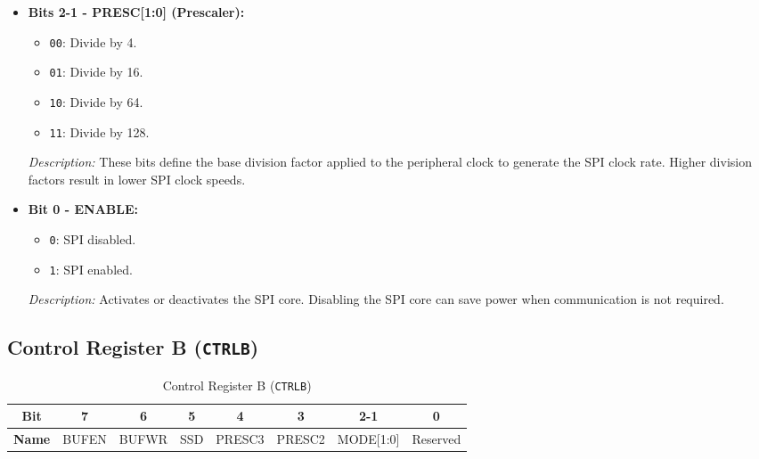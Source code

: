\documentclass{article}
\begin{document}
\begin{itemize}
    \item \textbf{Bits 2-1 - PRESC[1:0] (Prescaler):} 
    \begin{itemize}
        \item \texttt{00}: Divide by 4.
        \item \texttt{01}: Divide by 16.
        \item \texttt{10}: Divide by 64.
        \item \texttt{11}: Divide by 128.
    \end{itemize}
    \textit{Description:} These bits define the base division factor applied to the peripheral clock to generate the SPI clock rate. Higher division factors result in lower SPI clock speeds.
    
    \item \textbf{Bit 0 - ENABLE:} 
    \begin{itemize}
        \item \texttt{0}: SPI disabled.
        \item \texttt{1}: SPI enabled.
    \end{itemize}
    \textit{Description:} Activates or deactivates the SPI core. Disabling the SPI core can save power when communication is not required.
\end{itemize}

\subsection{Control Register B (\texttt{CTRLB})}
\label{sec:ctrlb}

\begin{table}[H]
    \centering
    \caption{Control Register B (\texttt{CTRLB})}
    \begin{tabular}{@{}cccccccc@{}}
        \toprule
        \textbf{Bit} & 7 & 6 & 5 & 4 & 3 & 2-1 & 0 \\ \midrule
        \textbf{Name} & BUFEN & BUFWR & SSD & PRESC3 & PRESC2 & MODE[1:0] & Reserved \\ \bottomrule
    \end{tabular}
    \label{tab:ctrl_b}
\end{table}
\end{document}
